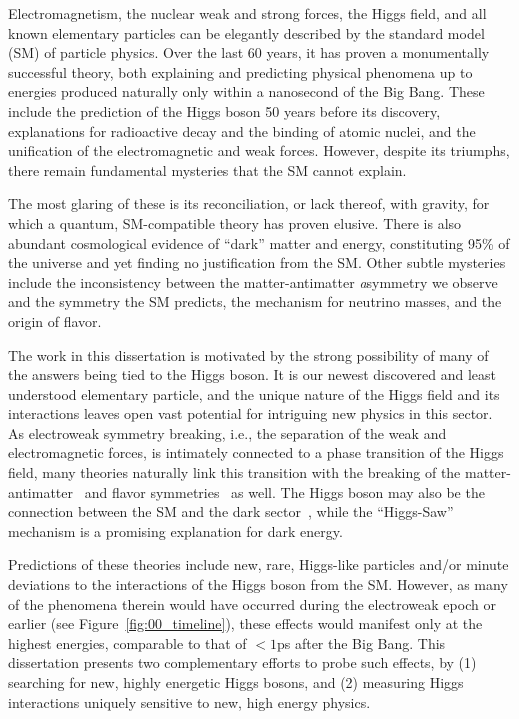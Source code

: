 \begin{dissertationintroduction}
Electromagnetism, the nuclear weak and strong forces, the Higgs field, and all known elementary particles can be elegantly described by the standard model (SM) of particle physics.
Over the last 60 years, it has proven a monumentally successful theory, both explaining and predicting physical phenomena up to energies produced naturally only within a nanosecond of the Big Bang.
These include the prediction of the Higgs boson 50 years before its discovery, explanations for radioactive decay and the binding of atomic nuclei, and the unification of the electromagnetic and weak forces.
However, despite its triumphs, there remain fundamental mysteries that the SM cannot explain.

The most glaring of these is its reconciliation, or lack thereof, with gravity, for which a quantum, SM-compatible theory has proven elusive.
There is also abundant cosmological evidence of ``dark'' matter and energy, constituting 95\% of the universe and yet finding no justification from the SM.
Other subtle mysteries include the inconsistency between the matter-antimatter \textit{a}symmetry  we observe and the symmetry the SM predicts, the mechanism for neutrino masses, and the origin of flavor.

The work in this dissertation is motivated by the strong possibility of many of the answers being tied to the Higgs boson.
It is our newest discovered and least understood elementary particle, and the unique nature of the Higgs field and its interactions leaves open vast potential for intriguing new physics in this sector.
As electroweak symmetry breaking, i.e., the separation of the weak and electromagnetic forces, is intimately connected to a phase transition of the Higgs field, many theories naturally link this transition with the breaking of the matter-antimatter~\cite{Morrissey_2012} and flavor symmetries~\cite{BAZZOCCHI2005372} as well.
The Higgs boson may also be the connection between the SM and the dark sector~\cite{sym13122406}, while the ``Higgs-Saw''~\cite{Krauss:2013oea} mechanism is a promising explanation for dark energy.

Predictions of these theories include new, rare, Higgs-like particles and/or minute deviations to the interactions of the Higgs boson from the SM.
However, as many of the phenomena therein would have occurred during the electroweak epoch or earlier (see Figure~\ref{fig:00_timeline}), these effects would manifest only at the highest energies, comparable to that of $<1$ps after the Big Bang.
This dissertation presents two complementary efforts to probe such effects, by (1) searching for new, highly energetic Higgs bosons, and (2) measuring Higgs interactions uniquely sensitive to new, high energy physics.


\end{dissertationintroduction}

